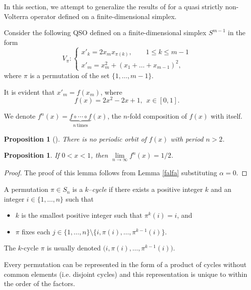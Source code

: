 \documentclass[11pt,reqno]{amsart}
\newtheorem{proposition}[subsection]{Proposition}
\numberwithin{equation}{section} \setcounter{tocdepth}{1}
\begin{document}
In this section, we attempt to generalize the results of \cite{Khukr} for a quasi strictly non-Volterra operator defined
on a finite-dimensional simplex.

Consider the following QSO defined on a finite-dimensional simplex $S^{m-1}$ in the form
\begin{equation}\label{op1}
V_\pi: \left\{\begin{array}{ll}
              x'_{k}= 2x_mx_{\pi(k)},\qquad 1\leq k\leq m-1 \\[2mm]
              x'_m=x^2_m+ (x_1+\dots+x_{m-1})^2 ,
\end{array}\right.
\end{equation}
where $\pi$ is a permutation of the set $\{1,\dots,m-1\}$.

It is evident that $x'_m=f(x_m)$, where
\[ f(x)=2x^2-2x+1, \ \ x\in [0, 1].\]

We denote $f^n(x)=\underbrace{f\circ\cdots\circ f}_{n \, \text{times}} (x)$,  the $n$-fold composition of $f(x)$ with itself.

\begin{proposition}[\cite{Khukr}]\label{per2f} There is no periodic orbit of $f(x)$ with period $n>2$.
\end{proposition}

\begin{proposition}\label{trajf}
If $0<x<1$, then $\lim\limits_{n\rightarrow\infty} f^n(x) =1/2$.
\end{proposition}

\begin{proof}
The proof of this lemma follows from Lemma \ref{falfa} substituting $\alpha=0$.
\end{proof}


 A permutation $\pi\in S_n$ is a $k$--\emph{cycle} if there exists a positive integer $k$
and an integer $i\in \{1,\dots, n\}$ such that
\begin{itemize}
\item[(1)] $k$ is the smallest positive integer such that $\pi^k (i) = i$, and
\item[(2)] $\pi$ fixes each $j\in \{1, \dots, n\} \setminus \{i, \pi(i), \dots , \pi^{k-1}(i)\}$.
\end{itemize}
The $k$-cycle $\pi$ is usually denoted $\big(i, \pi(i), \dots , \pi^{k-1}(i)\big)$.

Every permutation can be represented in the form of a product of cycles without common elements (i.e. disjoint cycles) and this representation is unique to within the order of the factors.
\end{document}
